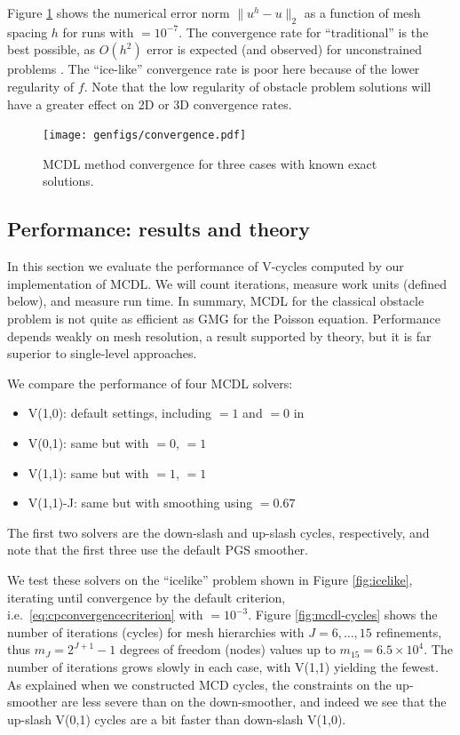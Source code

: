 \documentclass[letterpaper,final,12pt,reqno]{amsart}
\theoremstyle{claim}
\numberwithin{equation}{section}
\numberwithin{figure}{section}
\numberwithin{table}{section}
\numberwithin{theorem}{section}
\begin{document}
Figure \ref{fig:convergence} shows the numerical error norm $\|u^h-u\|_2$ as a function of mesh spacing $h$ for runs with  $=10^{-7}$.  The convergence rate for ``traditional'' is the best possible, as $O(h^2)$ error is expected (and observed) for unconstrained problems \cite{Elmanetal2014}.  The ``ice-like'' convergence rate is poor here because of the lower regularity of $f$.  Note that the low regularity of obstacle problem solutions will have a greater effect on 2D or 3D convergence rates.

\begin{figure}
\texttt{[image: genfigs/convergence.pdf]}
\caption{MCDL method convergence for three cases with known exact solutions.}
\label{fig:convergence}
\end{figure}

\subsection*{Performance: results and theory}  In this section we evaluate the performance of V-cycles computed by our implementation of MCDL.  We will count iterations, measure work units (defined below), and measure run time.  In summary, MCDL for the classical obstacle problem is not quite as efficient as GMG for the Poisson equation.  Performance depends weakly on mesh resolution, a result supported by theory, but it is far superior to single-level approaches.

We compare the performance of four MCDL solvers:
\begin{itemize}
\item \textsf{V(1,0)}: default settings, including  $=1$ and  $=0$ in 
\item \textsf{V(0,1)}: same but with  $=0$,  $=1$
\item \textsf{V(1,1)}: same but with  $=1$,  $=1$
\item \textsf{V(1,1)-J}: same but with  smoothing using  $=0.67$
\end{itemize}
The first two solvers are the down-slash and up-slash cycles, respectively, and note that the first three use the default PGS smoother.

We test these solvers on the ``icelike'' problem shown in Figure \ref{fig:icelike}, iterating until convergence by the default criterion, i.e.~\eqref{eq:cpconvergencecriterion} with  $=10^{-3}$.  Figure \ref{fig:mcdl-cycles} shows the number of iterations (cycles) for mesh hierarchies with $J=6,\dots,15$ refinements, thus $m_J=2^{J+1}-1$ degrees of freedom (nodes) values up to $m_{15}=6.5 \times 10^4$.  The number of iterations grows slowly in each case, with V(1,1) yielding the fewest.  As explained when we constructed MCD cycles, the constraints on the up-smoother are less severe than on the down-smoother, and indeed we see that the up-slash V(0,1) cycles are a bit faster than down-slash V(1,0).
\end{document}
